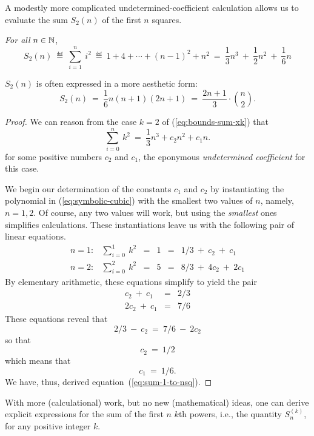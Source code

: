 \medskip

%
A modestly more complicated undetermined-coefficient calculation
allows us to evaluate the sum $S_2(n)$ of the first $n$ squares.

{\em For all} $n \in \mathbb{N}$,
\begin{equation}
\label{eq:sum-1-to-nsq}
S_2(n) \ \eqdef \ \sum_{i=1}^n \ i^2 
 \ \eqdef \  1 + 4 + \cdots + (n-1)^2 + n^2
 \ = \ \frac{1}{3} n^3 \ + \ \frac{1}{2} n^2 \ + \ \frac{1}{6} n
\end{equation}

$S_2(n)$ is often expressed in a more aesthetic form:
\[ S_2(n) \ = \
\frac{1}{6} n (n+1)(2n+1) \ = \
\frac{2n+1}{3} \cdot {n \choose 2}.
\]

\begin{proof}
We can reason from the case $k=2$ of (\ref{eq:bounds-sum-xk}) that
\begin{equation}
\label{eq:symbolic-cubic}
\sum_{i=0}^n \ k^2 \ = \ \frac{1}{3} n^3 + c_2 n^2 + c_1 n.
\end{equation}
for some positive numbers $c_2$ and $c_1$, the eponymous {\it
  undetermined coefficient} for this case.

We begin our determination of the constants $c_1$ and $c_2$ by
instantiating the polynomial in (\ref{eq:symbolic-cubic}) with the
smallest two values of $n$, namely, $n = 1,2$.  Of course, any two
values will work, but using the {\em smallest} ones simplifies
calculations.  These instantiations leave us with the following pair
of linear equations.
\[
\begin{array}{cccccl}
n=1: & \sum_{i=0}^1 \ k^2
   & = & 1 & = &
1/3 \ + \ c_2 \ + \ c_1 \\
n=2: & \sum_{i=0}^2 \ k^2
   & = & 5 & = &
8/3 \ + \ 4 c_2 \ + \ 2 c_1
\end{array}
\]
By elementary arithmetic, these equations simplify to yield the pair
\[
\begin{array}{ccc}
c_2 \ + \ c_1   & = & 2/3 \\
2 c_2 \ + \ c_1 & = & 7/6
\end{array}
\]
These equations reveal that
\[ 2/3 \ - \ c_2 \ = \ 7/6 \ - \ 2 c_2 \]
so that 
\[ c_2 \ = \ 1/2 \]
which means that
\[ c_1 \ = \ 1/6. \]
We have, thus, derived equation~(\ref{eq:sum-1-to-nsq}).  
\end{proof}

With more (calculational) work, but no new (mathematical) ideas, one
can derive explicit expressions for the sum of the first $n$ $k$th
powers, i.e., the quantity $S^{(k)}_n$, for any positive integer $k$.



